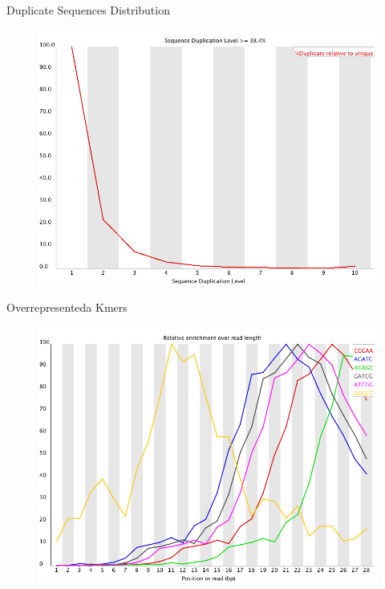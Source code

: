 \begin{frame}{Duplicate Sequences Distribution}

\begin{figure}[htbp]
\centering
\includegraphics[width=\textwidth,height=0.8\textheight,keepaspectratio]{images/duplication_levels}
\end{figure}

\end{frame}

\begin{frame}{Overrepresenteda Kmers}

\begin{figure}[htbp]
\centering
\includegraphics[width=\textwidth,height=0.8\textheight,keepaspectratio]{images/kmer_profiles}
\end{figure}

\end{frame}

